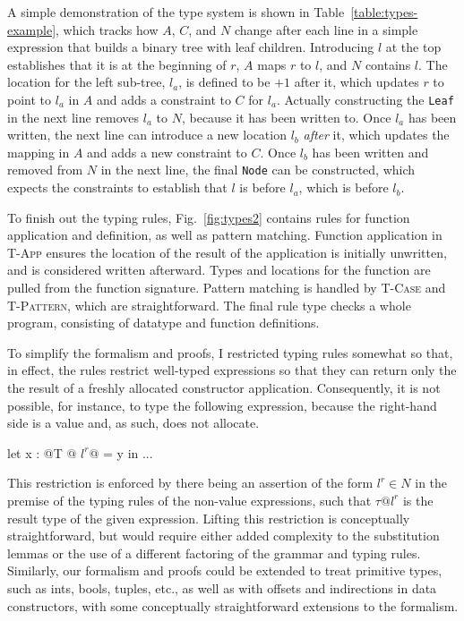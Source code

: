 \documentclass[showabstract,showacknowledgments,showpreface,showdedication,school]{iuphd}
\makeatletter
\theoremstyle{nonumberplain}
\newcommand{\keywd}[1]{\mathit{#1}}
\newcommand{\skeywd}[1]{\mathit{#1}}
\newcommand{\TYP}{\keywd{\tau}}
\newcommand{\loc}{\skeywd{l}}
\newcommand{\reg}{\skeywd{r}}
\newcommand{\CENV}{\keywd{C}}
\newcommand{\AENV}{\keywd{A}}
\newcommand{\NENV}{\keywd{N}}
\newcommand{\locreg}[2]{\ensuremath{{#1}^{#2}}}
\newcommand{\tyatlocreg}[3]{#1 \ensuremath{@} \locreg{#2}{#3}}
\newcommand{\tcase}{T-Case}
\newcommand{\tpat}{T-Pattern}
\newcommand{\tapp}{T-App}
\newcommand{\Figref}[1]{Fig.~\ref{#1}}
\makeatother
\begin{document}
{A simple demonstration of the type system is shown in
Table~\ref{table:types-example}, which tracks how $\AENV$, $\CENV$,
and $\NENV$
change after each line in a simple expression that builds
a binary tree with leaf children. Introducing $\loc$ at the top
establishes that it is at the beginning of $\reg$,
$\AENV$ maps $\reg$ to $\loc$, and $\NENV$ contains $\loc$.
The location for the left sub-tree,
$\loc_a$, is defined to be $+ 1$ after it, which updates $\reg$ to
point to $\loc_a$ in $\AENV$ and adds a constraint to $\CENV$ for
$\loc_a$. Actually constructing the \texttt{Leaf} in the next line
removes $\loc_a$ to $\NENV$, because it has been written to. Once $\loc_a$
has been written, the next line can introduce a new location $\loc_b$
\emph{after} it, which updates the mapping in $\AENV$ and adds a
new constraint to $\CENV$. Once $\loc_b$ has been written and removed
from $\NENV$ in the next line, the final \texttt{Node} can be constructed,
which expects the constraints to establish that $\loc$ is before $\loc_a$,
which is before $\loc_b$.}





To finish out the typing rules, \Figref{fig:types2} contains rules for
function application and definition, as well as pattern matching.
Function application in \textsc{\tapp} ensures the location of the result of
the application is initially unwritten, and is considered written afterward.
Types and locations for the function are pulled from the function signature.
Pattern matching is handled by \textsc{\tcase} and \textsc{\tpat}, which
are straightforward.
The final rule type checks a whole program, consisting of datatype
and function definitions.

To simplify the formalism and proofs, I restricted typing rules
somewhat so that, in effect, the rules restrict well-typed expressions
so that they can return only the the result of a freshly allocated
constructor application.
Consequently, it is not possible, for instance, to type the following
expression, because the right-hand side is a value and, as such, does
not allocate.
\begin{code}
let x : @\tyatlocreg{T}{l}{r}@ = y in ...
\end{code}
This restriction is enforced by there being an assertion of the form
$\locreg{\loc}{\reg} \in \NENV$ in the premise of the typing rules of
the non-value expressions, such that $\tyatlocreg{\TYP}{\loc}{\reg}$
is the result type of the given expression.
Lifting this restriction is conceptually straightforward, but would
require either added complexity to the substitution lemmas or the use
of a different factoring of the grammar and typing rules.
Similarly, our formalism and proofs could be extended to treat
primitive types, such as ints, bools, tuples, etc., as well as with
offsets and indirections in data constructors, with some conceptually
straightforward extensions to the formalism.
\end{document}

